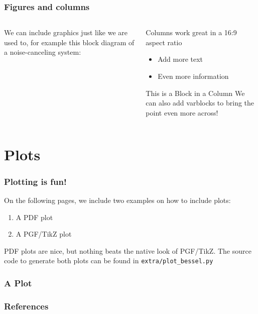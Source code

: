 \documentclass[pdf,smaller,aspectratio=169]{beamer}
\begin{document}
\begin{frame}
  \frametitle{Figures and columns}
  \begin{columns}[t]
    \begin{column}{0.48\textwidth}
  We can include graphics just like we are used to, for example this block
  diagram of a noise-canceling system:
  \begin{center}
    
  \end{center}
\end{column}
\vrule{}
\begin{column}{0.48\textwidth}
  Columns work great in a 16:9 aspect ratio
  \begin{itemize}
  \item Add more text
  \item Even more information
  \end{itemize}
  \vfill
  \begin{varblock}[0.95\textwidth]{This is a Block in a Column}
    We can also add varblocks to bring the point even more across!
  \end{varblock}
\end{column}
  \end{columns}
\end{frame}

\section{Plots}
\label{sec:plots}

\begin{frame}
  \frametitle{Plotting is fun!}

  On the following pages, we include two examples on how to include plots:
  \begin{enumerate}
    \item A PDF plot
    \item A PGF/TikZ plot
  \end{enumerate}

  PDF plots are nice, but nothing beats the native look of PGF/TikZ. The source
  code to generate both plots can be found in \texttt{extra/plot\_bessel.py}
\end{frame}

\begin{frame}
  \frametitle{A Plot}
  \begin{center}
    
  \end{center}
\end{frame}

\sectionimage{}
\begin{frame}[allowframebreaks]
  \frametitle{References}
  \renewcommand*{\bibfont}{\scriptsize}
  \printbibliography
\end{frame}
\end{document}
